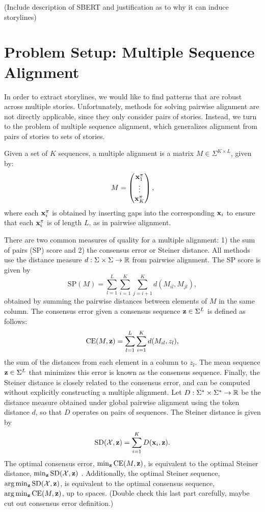 \documentclass{article}
\begin{document}
(Include description of SBERT and justification as to why it can induce storylines)

\section{Problem Setup: Multiple Sequence Alignment}
In order to extract storylines, we would like to find patterns that are robust across
multiple stories. 
Unfortunately, methods for solving pairwise alignment are not directly applicable, since they
only consider pairs of stories.
Instead, we turn to the problem of multiple sequence alignment,
which generalizes alignment from pairs of stories to sets of stories.

Given a set of $K$ sequences,
a multiple alignment is a matrix $M \in \Sigma^{K \times L}$, given by:
\begin{equation}
M = \begin{pmatrix}
    \mathbf{x}_1^\pi \\
    \vdots \\
    \mathbf{x}_K^\pi
\end{pmatrix},
\end{equation}
where each $\mathbf{x}_i^\pi$ is obtained by inserting gaps into the corresponding $\mathbf{x}_i$
to ensure that each $\mathbf{x}_i^\pi$ is of length $L$, as in pairwise alignment.

There are two common measures of quality for a multiple alignment:
1) the sum of pairs (SP) score and 2) the consensus error or Steiner distance.
All methods use the distance measure $d: \Sigma\times\Sigma\to\mathbb{R}$ from pairwise alignment.
The SP score is given by
\begin{equation}
\mathrm{SP}(M) = \sum_{l=1}^L \sum_{i=1}^K \sum_{j=i+1}^K d(M_{il}, M_{jl}),
\end{equation}
obtained by summing the pairwise distances between elements of $M$ in the same column.
The consensus error given a consensus sequence $\mathbf{z}\in\Sigma^L$ is defined as follows:
\begin{equation}
\mathrm{CE}(M, \mathbf{z}) = \sum_{l=1}^L \sum_{i=1}^K d(M_{il}, z_{l}),
\end{equation}
the sum of the distances from each element in a column to $z_l$.
The mean sequence $\mathbf{z}\in\Sigma^L$ that minimizes this error is known as the consensus sequence.
Finally, the Steiner distance is closely related to the consensus error,
and can be computed without explicitly constructing a multiple alignment.
Let $D: \Sigma^* \times \Sigma^* \to \mathbb{R}$
be the distance measure obtained under global pairwise alignment using the token distance $d$,
so that $D$ operates on pairs of sequences.
The Steiner distance is given by
\begin{equation}
\mathrm{SD}(\mathcal{X}, \mathbf{z}) = \sum_{i=1}^K D(\mathbf{x}_i, \mathbf{z}).
\end{equation}
The optimal consensus error, $\min_{\mathbf{z}}\mathrm{CE}(M,\mathbf{z})$,
is equivalent to the optimal Steiner distance, $\min_{\mathbf{z}}\mathrm{SD}(\mathcal{X}, \mathbf{z})$
\citep{gusfield1997}.
Additionally, the optimal Steiner sequence, $\arg\min_{\mathbf{z}}\mathrm{SD}(\mathcal{X}, \mathbf{z})$,
is equivalent to the optimal consensus sequence, $\arg\min_{\mathbf{z}}\mathrm{CE}(M,\mathbf{z})$,
up to spaces.
(Double check this last part carefully, maybe cut out consensus error definition.)
\end{document}
